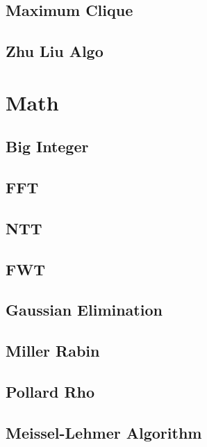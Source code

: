\documentclass[a4paper,10pt,twocolumn,oneside]{article}
\begin{document}
\subsection{Maximum Clique}


\subsection{Zhu Liu Algo}


\section{Math}
\subsection{Big Integer}


\subsection{FFT}


\subsection{NTT}


\subsection{FWT}


\subsection{Gaussian Elimination}


\subsection{Miller Rabin}


\subsection{Pollard Rho}


\subsection{Meissel-Lehmer Algorithm}

\end{document}
